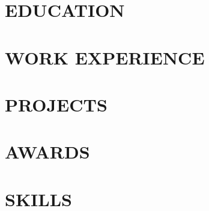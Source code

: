 \documentclass[letterpaper,11pt]{article}
\begin{document}

\vspace{\resumeHeaderGap}

%     

\section{EDUCATION}
\resumeEntryListStart
  
  
\resumeEntryListEnd

\section{WORK EXPERIENCE}
\resumeEntryListStart
  
  
\resumeEntryListEnd

\section{PROJECTS}
\resumeEntryListStart
  
  
\resumeEntryListEnd

\section{AWARDS}
{\noindent\small

}

\section{SKILLS}
\begin{itemize}[leftmargin=0in, label={}]
  
\end{itemize}
\end{document}
